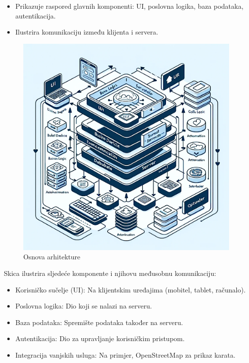 	   
	   \begin{itemize}
	   	\item {Prikazuje raspored glavnih komponenti: UI, poslovna logika, baza podataka, autentikacija.}
	   	\item {Ilustrira komunikaciju između klijenta i servera.}			
	   \end{itemize}
	   
		
		\eject
		
		\begin{figure}[H]
			\includegraphics[width=\textwidth]{slike/arhitektura.PNG} %
			\centering
			\caption{Osnova arhitekture}
			\label{fig5:promjene}
		\end{figure}
		
		\eject
	
  Skica ilustrira sljedeće komponente i njihovu međusobnu komunikaciju:
   \begin{itemize}
		  \item {Korisničko sučelje (UI): Na klijentskim uređajima (mobitel, tablet, računalo).}
		  \item {Poslovna logika: Dio koji se nalazi na serveru.}	
            \item {Baza podataka: Spremište podataka također na serveru.}
		  \item {Autentikacija: Dio za upravljanje korisničkim pristupom.}	
            \item {Integracija vanjskih usluga: Na primjer, OpenStreetMap za prikaz karata.}
	   \end{itemize}

